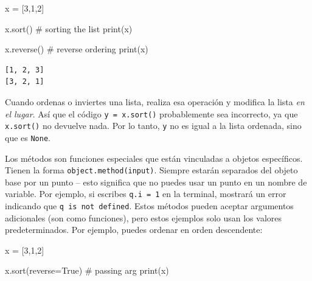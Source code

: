 \documentclass[
  letterpaper,
]{scrbook}
\newenvironment{Shaded}{\begin{snugshade}}{\end{snugshade}}
\newcommand{\BuiltInTok}[1]{\textcolor[rgb]{0.00,0.23,0.31}{#1}}
\newcommand{\CommentTok}[1]{\textcolor[rgb]{0.37,0.37,0.37}{#1}}
\newcommand{\DecValTok}[1]{\textcolor[rgb]{0.68,0.00,0.00}{#1}}
\newcommand{\NormalTok}[1]{\textcolor[rgb]{0.00,0.23,0.31}{#1}}
\newcommand{\OperatorTok}[1]{\textcolor[rgb]{0.37,0.37,0.37}{#1}}
\newcommand{\VariableTok}[1]{\textcolor[rgb]{0.07,0.07,0.07}{#1}}
\begin{document}
\begin{Shaded}
\begin{Highlighting}[]
\NormalTok{x }\OperatorTok{=}\NormalTok{ [}\DecValTok{3}\NormalTok{,}\DecValTok{1}\NormalTok{,}\DecValTok{2}\NormalTok{]}

\NormalTok{x.sort() }\CommentTok{\# sorting the list}
\BuiltInTok{print}\NormalTok{(x)}

\NormalTok{x.reverse() }\CommentTok{\# reverse ordering}
\BuiltInTok{print}\NormalTok{(x)}
\end{Highlighting}
\end{Shaded}

\begin{verbatim}
[1, 2, 3]
[3, 2, 1]
\end{verbatim}

\begin{tcolorbox}[enhanced jigsaw, colbacktitle=quarto-callout-note-color!10!white, arc=.35mm, opacityback=0, colframe=quarto-callout-note-color-frame, colback=white, left=2mm, leftrule=.75mm, title={Note}, bottomtitle=1mm, rightrule=.15mm, toptitle=1mm, coltitle=black, titlerule=0mm, toprule=.15mm, bottomrule=.15mm, opacitybacktitle=0.6, breakable]

Cuando ordenas o inviertes una lista, realiza esa operación y modifica
la lista \emph{en el lugar}. Así que el código \texttt{y\ =\ x.sort()}
probablemente sea incorrecto, ya que \texttt{x.sort()} no devuelve nada.
Por lo tanto, \texttt{y} no es igual a la lista ordenada, sino que es
\texttt{None}.

\end{tcolorbox}

Los métodos son funciones especiales que están vinculadas a objetos
específicos. Tienen la forma \texttt{object.method(input)}. Siempre
estarán separados del objeto base por un punto -- esto significa que no
puedes usar un punto en un nombre de variable. Por ejemplo, si escribes
\texttt{q.i\ =\ 1} en la terminal, mostrará un error indicando que
\texttt{q\ is\ not\ defined}. Estos métodos pueden aceptar argumentos
adicionales (son como funciones), pero estos ejemplos solo usan los
valores predeterminados. Por ejemplo, puedes ordenar en orden
descendente:

\begin{Shaded}
\begin{Highlighting}[]
\NormalTok{x }\OperatorTok{=}\NormalTok{ [}\DecValTok{3}\NormalTok{,}\DecValTok{1}\NormalTok{,}\DecValTok{2}\NormalTok{]}

\NormalTok{x.sort(reverse}\OperatorTok{=}\VariableTok{True}\NormalTok{) }\CommentTok{\# passing arg}
\BuiltInTok{print}\NormalTok{(x)}
\end{Highlighting}
\end{Shaded}
\end{document}
